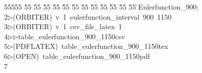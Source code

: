 %
%
\begin{tabbing}
55555 \= 55 \= 55 \= 55 \= 55 \= 55 \= 55 \= 55 \= 55 \= 55 \= 55 \= 55 \= 55 \= \>Eulerfunction\_900:\\[0pt]
2\>$\triangleright$\>(ORBITER)\ v\ 1\ eulerfunction\_interval\ 900\ 1150\\[0pt]
3\>$\triangleright$\>(ORBITER)\ v\ 1\ csv\_file\_latex\ 1\ \\[0pt]
4\>$\triangleright$\>$\triangleright$\>table\_eulerfunction\_900\_1150csv\\[0pt]
5\>$\triangleright$\>(PDFLATEX)\ table\_eulerfunction\_900\_1150tex\\[0pt]
6\>$\triangleright$\>(OPEN)\ table\_eulerfunction\_900\_1150pdf\\[0pt]
7\>\end{tabbing}
